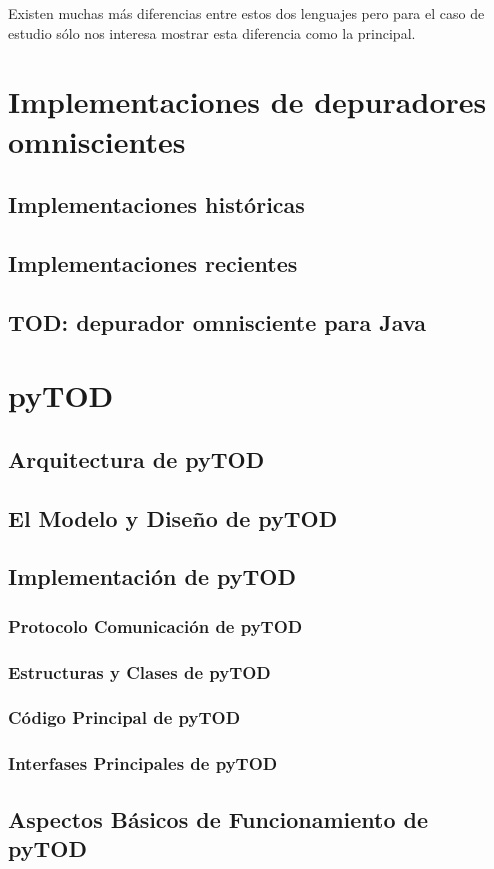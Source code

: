 \documentclass[12pt,a4paper]{report}
\begin{document}
Existen muchas más diferencias entre estos dos lenguajes pero para el caso de estudio sólo nos interesa mostrar esta diferencia como la principal.

\chapter{Implementaciones de depuradores omniscientes}
	\section{Implementaciones históricas}
	\section{Implementaciones recientes}
	\section{TOD: depurador omnisciente para Java}
\chapter{pyTOD}
	\section{Arquitectura de pyTOD}
	\section{El Modelo y Diseño de pyTOD}
	\section{Implementación de pyTOD}
		\subsection{Protocolo Comunicación de pyTOD}
		\subsection{Estructuras y Clases de pyTOD}
		\subsection{Código Principal de pyTOD}
		\subsection{Interfases Principales de pyTOD}
	\section{Aspectos Básicos de Funcionamiento de pyTOD}
\end{document}
